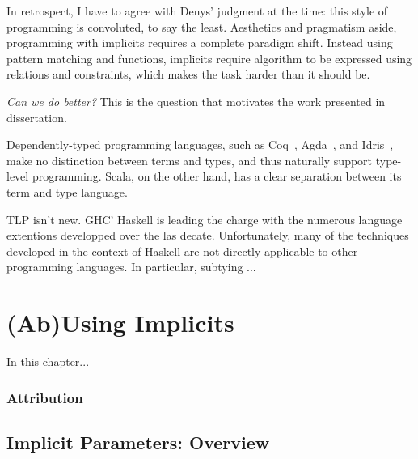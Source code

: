 In retrospect, I have to agree with Denys' judgment at the time: this style of programming is convoluted, to say the least.
Aesthetics and pragmatism aside, programming with implicits requires a complete paradigm shift.
Instead using pattern matching and functions, implicits require algorithm to be expressed using relations and constraints, which makes the task harder than it should be.

\emph{Can we do better?} This is the question that motivates the work presented in dissertation.

Dependently-typed programming languages, such as Coq~\citep{bertot2004interactive}, Agda~\citep{norell2007towards}, and Idris~\citep{brady2014idris}, make no distinction between terms and types, and thus naturally support type-level programming.
Scala, on the other hand, has a clear separation between its term and type language.


TLP isn't new. GHC' Haskell is leading the charge with the numerous language extentions developped over the las decate. Unfortunately, many of the techniques developed in the context of Haskell are not directly applicable to other programming languages. In particular, subtying ...



\lipsum[1]

\chapter{(Ab)Using Implicits}
\label{chap:ab-using-implicits}

In this chapter...

\subsection*{Attribution}
\citep{odersky2018simplicitly}

\section{Implicit Parameters: Overview}

